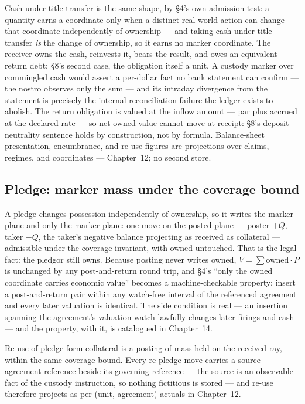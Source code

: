 Cash under title transfer is the same shape, by \S4's own admission test: a
quantity earns a coordinate only when a distinct real-world action can change
that coordinate independently of ownership --- and taking cash under title
transfer \emph{is} the change of ownership, so it earns no marker coordinate.
The receiver owns the cash, reinvests it, bears the result, and owes an
equivalent-return debt: \S8's second case, the obligation itself a unit. A
custody marker over commingled cash would assert a per-dollar fact no bank
statement can confirm --- the nostro observes only the sum --- and its
intraday divergence from the statement is precisely the internal
reconciliation failure the ledger exists to abolish. The return obligation is
valued at the inflow amount --- par plus accrued at the declared rate --- so
net owned value cannot move at receipt: \S8's deposit-neutrality sentence
holds by construction, not by formula. Balance-sheet presentation, encumbrance,
and re-use figures are projections over claims, regimes, and coordinates ---
Chapter~12; no second store.

\subsection{Pledge: marker mass under the coverage bound}

A pledge changes possession independently of ownership, so it writes the
marker plane and only the marker plane: one move on the posted plane ---
poster $+Q$, taker $-Q$, the taker's negative balance projecting as received
as collateral --- admissible under the coverage invariant, with owned
untouched. That is the legal fact: the pledgor still owns. Because posting
never writes owned, $V=\sum \mathrm{owned}\cdot P$ is unchanged by any
post-and-return round trip, and \S4's ``only the owned coordinate carries
economic value'' becomes a machine-checkable property: insert a
post-and-return pair within any watch-free interval of the referenced
agreement and every later valuation is identical. The side condition is real
--- an insertion spanning the agreement's valuation watch lawfully changes
later firings and cash --- and the property, with it, is catalogued in
Chapter~14.

Re-use of pledge-form collateral is a posting of mass held on the received
ray, within the same coverage bound. Every re-pledge move carries a
source-agreement reference beside its governing reference --- the source is an
observable fact of the custody instruction, so nothing fictitious is stored
--- and re-use therefore projects as per-(unit, agreement) actuals in
Chapter~12.

